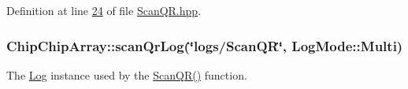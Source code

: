 Definition at line \hyperlink{ScanQR_8hpp_source_l00024}{24} of file \hyperlink{ScanQR_8hpp_source}{Scan\+Q\+R.\+hpp}.

\hypertarget{namespaceChipChipArray_ab5c6290951637c25a5422707020fb3a8}{
\subsubsection[{scan\+Qr\+Log}]{ Chip\+Chip\+Array\+::scan\+Qr\+Log(\char`\"{}logs/{\bf Scan\+Q\+R}\char`\"{}, Log\+Mode\+::\+Multi)}}\label{namespaceChipChipArray_ab5c6290951637c25a5422707020fb3a8}
The \hyperlink{classChipChipArray_1_1Log}{Log} instance used by the \hyperlink{namespaceChipChipArray_a6c7465049b5d408e1a238b6d8ffa887d}{Scan\+Q\+R()} function. 